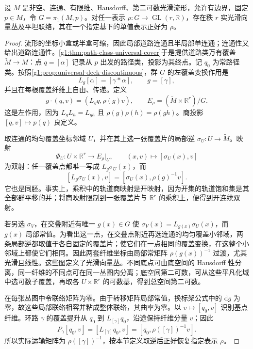 \begin{proposition}
	\label{g1:prop:flat-bundle-representation}
	设 \(M\) 是非空、连通、有限维、Hausdorff、第二可数光滑流形，允许有边界，固定 \(p\in M\)，令 \(G=\pi_1(M,p)\)。对任一表示 \(\rho:G\to\operatorname{GL}(r,\mathbb R)\)，存在秩 \(r\) 实光滑向量丛及平坦联络，其在一个指定基下的单值表示正好为 \(\rho\)。
\end{proposition}
\begin{proof}
	流形的坐标小盒或半盒可缩，因此局部道路连通且半局部单连通；连通性又给出道路连通性。\cref{g1:thm:path-class-universal-cover}于是提供道路类万有覆盖 \(\widetilde M\to M\)：点 \(q=[\alpha]\) 记录从 \(p\) 出发的路径类，投影为其终点。记 \(q_0\) 为常路径类。按照\cref{g1:prop:universal-deck-discontinuous}，群 \(G\) 的左覆盖变换作用是
	\[
		L_g[\alpha]=[\gamma*\alpha],\qquad g=[\gamma],
	\]
	并且在每根覆盖纤维上自由、传递。定义
	\[
		g\cdot(q,v)=(L_gq,\rho(g)v),\qquad
		E_\rho=(\widetilde M\times\mathbb R^r)/G.
	\]
	这是左作用，因为 \(L_gL_h=L_{gh}\) 且 \(\rho(g)\rho(h)=\rho(gh)\)。商投影 \([q,v]\mapsto p(q)\) 良定义。

	取连通的均匀覆盖坐标邻域 \(U\)，并在其上选一张覆盖片的局部逆 \(\sigma_U:U\to\widetilde M\)。映射
	\[
		\Phi_U:U\times\mathbb R^r\longrightarrow E_\rho|_U,\qquad
		(x,v)\longmapsto[\sigma_U(x),v]
	\]
	为双射：任一覆盖点都唯一写成 \(L_g\sigma_U(x)\)，而
	\[
		[L_g\sigma_U(x),v]=[\sigma_U(x),\rho(g)^{-1}v].
	\]
	它也是同胚。事实上，乘积中的轨道商映射是开映射，因为开集的轨道饱和集是其全部群平移的并；将商映射限制到一张覆盖片与 \(\mathbb R^r\) 的乘积上，便得到开连续双射。

	若另选 \(\sigma_V\)，在交叠附近有唯一 \(g(x)\in G\) 使 \(\sigma_V(x)=L_{g(x)}\sigma_U(x)\)，而 \(g(x)\) 局部常值。为看出这一点，在交叠点附近再选连通的均匀覆盖小邻域，两条局部逆都取值于各自固定的覆盖片；使它们在一点相同的覆盖变换，在这整个小邻域上都使它们相同。因此两套纤维坐标由局部常矩阵 \(\rho(g(x))^{-1}\) 过渡，尤其光滑且线性。这些图定义了光滑向量丛。不同底点可由底空间的 Hausdorff 性分离，同一纤维的不同点可在同一丛图内分离；底空间第二可数，可从这些平凡化域中选可数子覆盖，再取各 \(U\times\mathbb R^r\) 的可数基，得到总空间第二可数。

	在每张丛图中令联络矩阵为零。由于转移矩阵局部常值，换标架公式中的 \(\mathrm{d}g\) 为零，故这些局部联络相容并粘成整体联络，其曲率为零。以 \(v\mapsto[q_0,v]\) 识别基点纤维。环路 \(\gamma\) 的覆盖提升从 \(q_0\) 到 \(L_{[\gamma]}q_0\)，沿途保持纤维分量 \(v\)；因此
	\[
		P_\gamma[q_0,v]=[L_{[\gamma]}q_0,v]
		=[q_0,\rho([\gamma])^{-1}v].
	\]
	所以实际运输矩阵为 \(\rho([\gamma])^{-1}\)，按本节定义取逆后正好恢复指定表示 \(\rho\)。
\end{proof}

